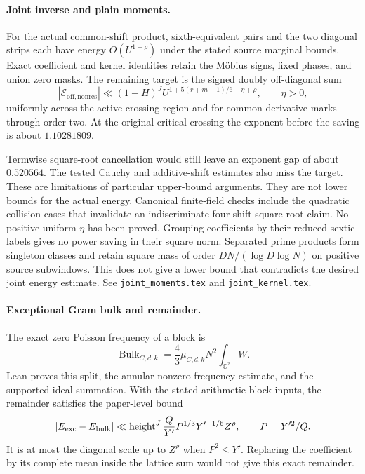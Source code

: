 \documentclass[11pt]{article}
\begin{document}
\paragraph{Joint inverse and plain moments.}
For the actual common-shift product, sixth-equivalent pairs and the two
diagonal strips each have energy $O(U^{1+\rho})$ under the stated
source marginal bounds. Exact coefficient and kernel identities retain
the M\"obius signs, fixed phases, and union zero masks.
The remaining target is the signed doubly off-diagonal sum
\[
 |\mathcal E_{\mathrm{off,nonres}}|
 \ll (1+H)^J U^{1+5(r+m-1)/6-\eta+\rho},\qquad \eta>0,
\]
uniformly across the active crossing region and for common derivative
marks through order two. At the original critical crossing the exponent
before the saving is about $1.10281809$.

Termwise square-root cancellation would still leave an exponent gap
of about $0.520564$. The tested Cauchy and additive-shift estimates also
miss the target. These are limitations of particular upper-bound
arguments. They are not lower bounds for the actual energy.
Canonical finite-field checks include the quadratic collision cases
that invalidate an indiscriminate four-shift square-root claim.
No positive uniform $\eta$ has been proved.
Grouping coefficients by their reduced sextic labels gives no power
saving in their square norm. Separated prime products form singleton
classes and retain square mass of order $DN/(\log D\log N)$ on
positive source subwindows. This does not give a lower bound that
contradicts the desired joint energy estimate.
See \texttt{joint\_moments.tex} and \texttt{joint\_kernel.tex}.

\paragraph{Exceptional Gram bulk and remainder.}
The exact zero Poisson frequency of a block is
\[
 \operatorname{Bulk}_{C,d,k}
 =\frac43\mu_{C,d,k}N^2\int_{\mathbb C^2}W.
\]
Lean proves this split, the annular nonzero-frequency estimate, and
the supported-ideal summation. With the stated arithmetic block inputs,
the remainder satisfies the paper-level bound
\[
 |E_{\rm exc}-E_{\rm bulk}|
 \ll \operatorname{height}^{J}\frac Q{Y'}
          P^{1/3}Y'^{-1/6}Z^\rho,\qquad P=Y'^2/Q.
\]
It is at most the diagonal scale up to $Z^\rho$ when $P^2\le Y'$.
Replacing the coefficient by its complete mean inside the lattice sum
would not give this exact remainder.
\end{document}
